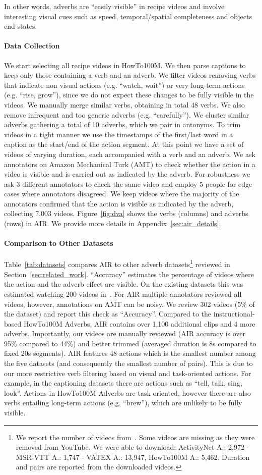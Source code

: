 \documentclass[10pt,twocolumn,letterpaper]{article}
\newcommand{\fparagraph}[1]{\paragraph{#1}}
\begin{document}
In other words, adverbs are ``easily visible'' in recipe videos and involve interesting visual cues 
such as speed, temporal/spatial completeness and objects end-states.

\fparagraph{Data Collection} We start selecting all recipe videos in HowTo100M. 
We then parse captions to keep only those containing a verb and an adverb. 
We filter videos removing verbs that indicate non visual actions (e.g. ``watch, wait'') or very long-term actions (e.g. ``rise, grow''), since we do not expect these changes to be fully visible in the videos. We manually merge similar verbs, obtaining in total 48 verbs.   
We also remove infrequent and too generic adverbs (e.g. ``carefully''). We cluster similar adverbs gathering a total of 10 adverbs, which we pair in antonyms. 
To trim videos in a tight manner 
we use 
the timestamps of the first/last word in a caption as the start/end of the action segment. At this point 
we have a set of videos of varying duration, each accompanied with a verb and an adverb. 
We ask annotators on Amazon Mechanical Turk (AMT) to check whether the action in a video is visible and is carried out as indicated by the adverb. For robustness we ask 3 different annotators to check the same video and employ 5 people for edge cases where annotators disagreed. 
We keep videos where the majority of the annotators confirmed that the action is visible as indicated by the adverb, collecting 7,003 videos. 
Figure~\ref{fig:dva} shows the verbs (columns) and adverbs (rows) in AIR.
We provide more details in Appendix~\ref{sec:air_details}. 

\fparagraph{Comparison to Other Datasets} Table~\ref{tab:datasets} compares AIR to other adverb datasets\footnote{
We report the number of videos from~\cite{doughty2022you}. Some videos are missing as they were removed from YouTube.
We were able to download: ActivityNet A.: 2,972 - MSR-VTT A.: 1,747 - VATEX A.: 13,947, HowTo100M A.: 5,462. Duration and pairs are reported from the downloaded videos.} reviewed in Section~\ref{sec:related_work}. 
``Accuracy'' estimates the percentage of videos where the action and the adverb effect are visible. 
On the existing datasets this was estimated watching 200 videos in~\cite{doughty2022you}. For AIR multiple annotators reviewed all videos, 
however, annotations on AMT can be noisy. We review 302 videos (5\% of the dataset) and report this check as ``Accuracy''. Compared to the instructional-based HowTo100M Adverbs, AIR contains over 1,100 additional clips and 4 more adverbs. Importantly, our videos are manually reviewed (AIR accuracy is over 95\% compared to 44\%) and better trimmed (averaged duration is 8s compared to fixed 20s segments).
AIR features 48 actions which is the smallest number among the five datasets (and consequently the smallest number of pairs). This is due to our more restrictive verb filtering based on visual and task-oriented actions. For example, in the captioning datasets there are actions such as ``tell, talk, sing, look''. 
Actions in HowTo100M Adverbs are task oriented, however there are also verbs entailing long-term actions (e.g. ``brew''), which are unlikely to be fully visible. 
\end{document}
